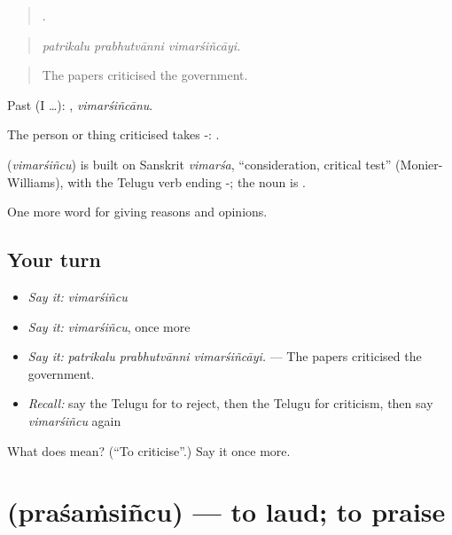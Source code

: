 \begin{quote}
  .
\end{quote}

\begin{quote}
\emph{patrikalu prabhutvānni vimarśiñcāyi.}
\end{quote}

\begin{quote}
The papers criticised the government.
\end{quote}

Past (I …): , \emph{vimarśiñcānu}.

The person or thing criticised takes -:  .

\begin{cousinweb}
\textbf{} (\emph{vimarśiñcu}) is built on Sanskrit \emph{vimarśa}, \textquotedblleft{}consideration, critical test\textquotedblright{} (Monier-Williams), with the Telugu verb ending -; the noun is .
\end{cousinweb}

\begin{grammarlens}[title={What you've built}]
One more word for giving reasons and opinions.
\end{grammarlens}

\subsection*{Your turn}
\begin{itemize}
\raggedright
  \item \emph{Say it:} \emph{vimarśiñcu}
  \item \emph{Say it:} \emph{vimarśiñcu}, once more
  \item \emph{Say it:} \emph{patrikalu prabhutvānni vimarśiñcāyi.} — The papers criticised the government.
  \item \emph{Recall:} say the Telugu for to reject, then the Telugu for criticism, then say \emph{vimarśiñcu} again
\end{itemize}

\begin{tcolorbox}[breakable,colback=teal!4,colframe=teal!35!black,title={Before you move on}]
What does  mean? (\textquotedblleft{}To criticise\textquotedblright{}.) Say it once more.
\end{tcolorbox}
\section[\texorpdfstring{\te{ప్రశంసించు} (praśaṁsiñcu)}{ప్రశంసించు (praśaṁsiñcu)}]{ (praśaṁsiñcu) — to laud; to praise}

